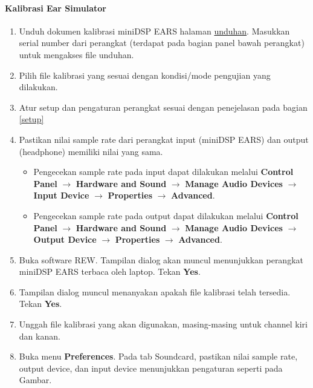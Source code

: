 \documentclass{article}
\begin{document}
	\paragraph{Kalibrasi Ear Simulator}
	\begin{enumerate}
		\item Unduh dokumen kalibrasi miniDSP EARS halaman \href{https://www.minidsp.com/products/acoustic-measurement/ears-headphone-jig}{unduhan}. Masukkan serial number dari perangkat (terdapat pada bagian panel bawah perangkat) untuk mengakses file unduhan.  
		
		\item Pilih file kalibrasi yang sesuai dengan kondisi/mode pengujian yang dilakukan. 
		
		\item Atur setup dan pengaturan perangkat sesuai dengan penejelasan pada bagian \ref{setup}
		
		\item Pastikan nilai sample rate dari perangkat input (miniDSP EARS) dan output (headphone) memiliki nilai yang sama. 
		\begin{itemize}
			\item Pengecekan sample rate pada input dapat dilakukan melalui {\bf Control Panel} $\rightarrow$ {\bf Hardware and Sound} $\rightarrow$ {\bf Manage Audio Devices} $\rightarrow$ {\bf Input Device} $\rightarrow$ {\bf Properties} $\rightarrow$ {\bf Advanced}.
			\item Pengecekan sample rate pada output dapat dilakukan melalui {\bf Control Panel} $\rightarrow$ {\bf Hardware and Sound} $\rightarrow$ {\bf Manage Audio Devices} $\rightarrow$ {\bf Output Device} $\rightarrow$ {\bf Properties} $\rightarrow$ {\bf Advanced}.
		\end{itemize}
		
		\item Buka software REW. Tampilan dialog akan muncul menunjukkan perangkat miniDSP EARS terbaca oleh laptop. Tekan {\bf Yes}.
		
		\item Tampilan dialog muncul menanyakan apakah file kalibrasi telah tersedia. Tekan {\bf Yes}.
		
		\item Unggah file kalibrasi yang akan digunakan, masing-masing untuk channel kiri dan kanan.
		
		\item Buka menu {\bf Preferences}. Pada tab Soundcard, pastikan nilai sample rate, output device, dan input device menunjukkan pengaturan seperti pada Gambar.
		

\end{enumerate}
\end{document}
